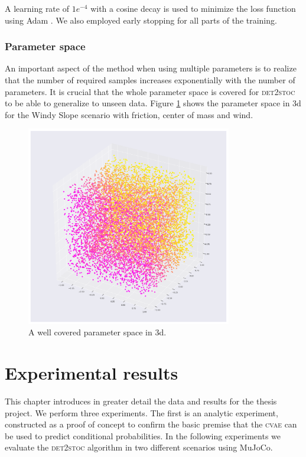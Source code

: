 \documentclass{kththesis}
\newcommand{\cvae}{\textsc{cvae}}
\newcommand{\dettostoc}{\textsc{det2stoc}}
\begin{document}
A learning rate of $1e^{-4}$ with a cosine decay is used to minimize the loss function using Adam \parencite{kingma2014adam}. We also employed early stopping for all parts of the training.

\subsection{Parameter space}

An important aspect of the method when using multiple parameters is to realize that the number of required samples increases exponentially with the number of parameters. It is crucial that the whole parameter space is covered for \dettostoc{} to be able to generalize to unseen data. Figure \ref{fig_parameter_space_3d} shows the parameter space in 3d for the Windy Slope scenario with friction, center of mass and wind.

\begin{figure}
\begin{center}
\includegraphics[width=0.8\textwidth]{img/parameter_space_3d}
\caption{A well covered parameter space in 3d.}
\label{fig_parameter_space_3d}
\end{center}
\end{figure}

\chapter{Experimental results}
\label{experiments}

This chapter introduces in greater detail the data and results for the thesis project. We perform three experiments. The first is an analytic experiment, constructed as a proof of concept to confirm the basic premise that the \cvae{} can be used to predict conditional probabilities. In the following experiments we evaluate the \dettostoc{} algorithm in two different scenarios using MuJoCo.
\end{document}
